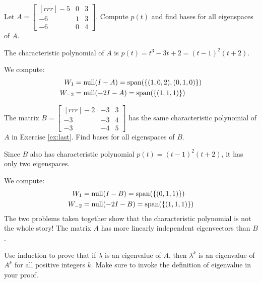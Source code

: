\ii \label{ex:last} Let $A=\begin{bmatrix}[rrr] -5&0&3\\ -6&1&3\\ -6&0&4\end{bmatrix}$. 
Compute $p(t)$ and find bases for all eigenspaces of $A$. 
\\
\begin{solution}
	The characteristic polynomial of $A$ is $p(t)=t^3-3t+2=(t-1)^2(t+2)$. 
	
	We compute:
	\begin{align*}
	W_{1}&=\operatorname{null}(I-A)=\operatorname{span}(\{(1,0,2),(0,1,0) \})\\
	W_{-2}&=\operatorname{null}(-2I-A)=\operatorname{span}(\{(1,1,1)\})
	\end{align*}
\end{solution}
\ii The matrix $B=\begin{bmatrix}[rrr]-2&-3&3\\ -3&-3&4\\ -3&-4&5\end{bmatrix}$ has the same characteristic polynomial of $A$ in Exercise \ref{ex:last}. Find bases for all eigenspaces of $B$. 
\\
\begin{solution}
	Since $B$ also has characteristic polynomial $p(t)=(t-1)^2(t+2)$, it has only two eigenspaces. 
	
	We compute:
	\begin{align*}
	W_{1}&=\operatorname{null}(I-B)=\operatorname{span}(\{ (0,1,1) \})\\
	W_{-2}&=\operatorname{null}(-2I-B)=\operatorname{span}(\{(1,1,1)\})
	\end{align*}
	The two problems taken together show that the characteristic polynomial is not the whole story! The matrix $A$ has more linearly independent eigenvectors than $B$. 
\end{solution}
\ii Use induction to prove that if $\lambda$ is an eigenvalue of $A$, then $\lambda^k$ is an eigenvalue of $A^k$ for all positive integers $k$. Make sure to invoke the definition of eigenvalue in your proof. 
